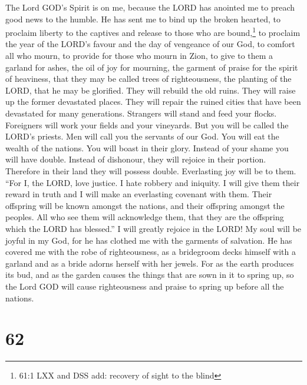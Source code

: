  The Lord GOD's Spirit is on me, because the LORD has
anointed me to preach good news to the humble. He has sent me to bind up
the broken hearted, to proclaim liberty to the captives and release to
those who are bound,\footnote{61:1 LXX and DSS add: recovery of sight to
  the blind}  to proclaim the year of the LORD's favour and
the day of vengeance of our God, to comfort all who mourn, 
to provide for those who mourn in Zion, to give to them a garland for
ashes, the oil of joy for mourning, the garment of praise for the spirit
of heaviness, that they may be called trees of righteousness, the
planting of the LORD, that he may be glorified.  They will
rebuild the old ruins. They will raise up the former devastated places.
They will repair the ruined cities that have been devastated for many
generations.  Strangers will stand and feed your flocks.
Foreigners will work your fields and your vineyards.  But
you will be called the LORD's priests. Men will call you the servants of
our God. You will eat the wealth of the nations. You will boast in their
glory.  Instead of your shame you will have double. Instead
of dishonour, they will rejoice in their portion. Therefore in their
land they will possess double. Everlasting joy will be to them.
 ``For I, the LORD, love justice. I hate robbery and
iniquity. I will give them their reward in truth and I will make an
everlasting covenant with them.  Their offspring will be
known amongst the nations, and their offspring amongst the peoples. All
who see them will acknowledge them, that they are the offspring which
the LORD has blessed.''  I will greatly rejoice in the
LORD! My soul will be joyful in my God, for he has clothed me with the
garments of salvation. He has covered me with the robe of righteousness,
as a bridegroom decks himself with a garland and as a bride adorns
herself with her jewels.  For as the earth produces its
bud, and as the garden causes the things that are sown in it to spring
up, so the Lord GOD will cause righteousness and praise to spring up
before all the nations.

\hypertarget{section-59}{%
\section{62}\label{section-59}}

